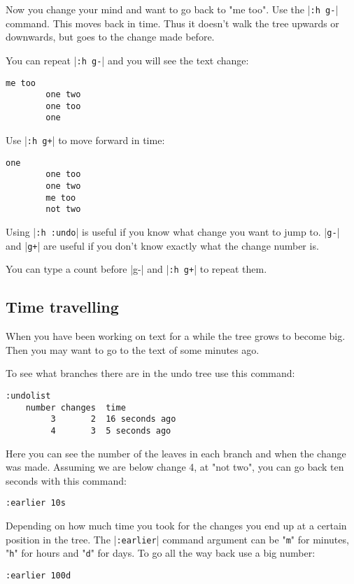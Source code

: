 Now you change your mind and want to go back to "me too".
Use the |\verb!:h g-!| command.
This moves back in time.
Thus it doesn't walk the tree upwards or downwards, but goes to the change made before.

You can repeat |\verb!:h g-!| and you will see the text change:

\begin{Verbatim}[samepage=true]
		me too 
		one two 
		one too 
		one 
\end{Verbatim}

Use |\verb!:h g+!| to move forward in time:

\begin{Verbatim}[samepage=true]
		one 
		one too 
		one two 
		me too 
		not two 
\end{Verbatim}

Using |\verb!:h :undo!| is useful if you know what change you want to jump to.
|\verb!g-!| and |\verb!g+!| are useful if you don't know exactly what the change number is.

You can type a count before |g-| and |\verb!:h g+!| to repeat them.
\subsection{Time travelling}
When you have been working on text for a while the tree grows to become big.
Then you may want to go to the text of some minutes ago.

To see what branches there are in the undo tree use this command:

\begin{Verbatim}[samepage=true]
 :undolist
	number changes  time 
		 3       2  16 seconds ago
		 4       3  5 seconds ago
\end{Verbatim}

Here you can see the number of the leaves in each branch and when the change was made.
Assuming we are below change 4, at "not two", you can go back ten seconds with this command:

\begin{Verbatim}[samepage=true]
 :earlier 10s
\end{Verbatim}

Depending on how much time you took for the changes you end up at a certain position in the tree.
The |\verb!:earlier!| command argument can be "\verb!m!" for minutes, "\verb!h!" for hours and "\verb!d!" for days.
To go all the way back use a big number:

\begin{Verbatim}[samepage=true]
 :earlier 100d
\end{Verbatim}

